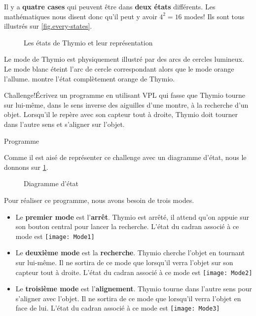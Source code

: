 Il y a \textbf{quatre cases} qui peuvent être dans \textbf{deux états} différents. Les mathématiques nous disent donc qu'il peut y avoir $4^2 = 16$ modes! Ils sont tous illustrés sur \cref{fig.every-states}.

\begin{figure}[h]
    \centering
    \hspace{1cm}
    \caption{Les états de Thymio et leur représentation}
\end{figure}

Le mode de Thymio est physiquement illustré par des arcs de cercles lumineux. Le mode blanc éteint l'arc de cercle correspondant alors que le mode orange l'allume.  montre l'état complètement orange de Thymio.


\begin{bclogo}[couleur = pink!30, arrondi = 0.1, logo = \bccrayon, ombre = true]{Challenge!}Écrivez un programme en utilisant VPL qui fasse que Thymio tourne sur lui-même, dans le sens inverse des aiguilles d'une montre, à la recherche d'un objet. Lorsqu'il le repère avec son capteur tout à droite, Thymio doit tourner dans l'autre sens et s'aligner sur l'objet.
\end{bclogo}

{\raggedleft \hfill Programme }

Comme il est aisé de représenter ce challenge avec un diagramme d'état, nous le donnons sur \cref{fig.State_diagram_mouse}.

\begin{figure}[h]
\begin{center}
\caption{Diagramme d'état}\label{fig.State_diagram_mouse}
\end{center}
\end{figure}

Pour réaliser ce programme, nous avons besoin de trois modes. 

\begin{itemize}
	\item Le \textbf{premier mode} est l'\textbf{arrêt}. Thymio est arrêté, il attend qu'on appuie sur son bouton central pour lancer la recherche. L'état du cadran associé à ce mode est \texttt{[image: Mode1]}
	\item Le \textbf{deuxième mode} est la \textbf{recherche}. Thymio cherche l'objet en tournant sur lui-même. Il ne sortira de ce mode que lorsqu'il verra l'objet sur son capteur tout à droite. L'état du cadran associé à ce mode est \texttt{[image: Mode2]}
	\item Le \textbf{troisième mode} est l'\textbf{alignement}. Thymio tourne dans l'autre sens pour s'aligner avec l'objet. Il ne sortira de ce mode que lorsqu'il verra l'objet en face de lui. L'état du cadran associé à ce mode est \texttt{[image: Mode3]}
\end{itemize}

